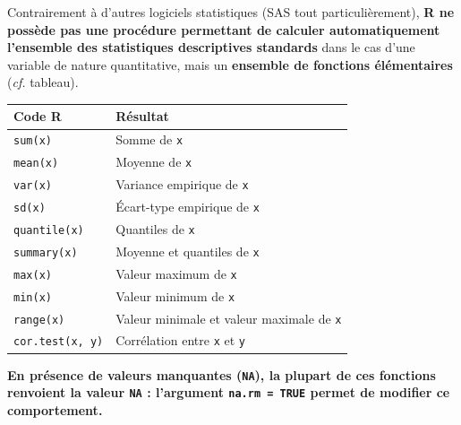 \documentclass[12pt,twosided, notitlepage]{book}
\begin{document}
Contrairement à d'autres logiciels statistiques (SAS tout
particulièrement), \textbf{R ne possède pas une procédure permettant de
calculer automatiquement l'ensemble des statistiques descriptives
standards} dans le cas d'une variable de nature quantitative, mais un
\textbf{ensemble de fonctions élémentaires} (\emph{cf.} tableau).

\begin{longtable}[]{@{}ll@{}}
\toprule
\textbf{Code R} & \textbf{Résultat}\tabularnewline
\midrule
\endhead
\texttt{sum(x)}\index{\texttt{sum}|textbf} & Somme de
\texttt{x}\tabularnewline
\texttt{mean(x)}\index{\texttt{mean}|textbf} & Moyenne de
\texttt{x}\tabularnewline
\texttt{var(x)}\index{\texttt{var}|textbf} & Variance empirique de
\texttt{x}\tabularnewline
\texttt{sd(x)}\index{\texttt{sd}|textbf} & Écart-type empirique de
\texttt{x}\tabularnewline
\texttt{quantile(x)}\index{\texttt{quantile}|textbf} & Quantiles de
\texttt{x}\tabularnewline
\texttt{summary(x)}\index{\texttt{summary}|textbf} & Moyenne et
quantiles de \texttt{x}\tabularnewline
\texttt{max(x)}\index{\texttt{max}|textbf} & Valeur maximum de
\texttt{x}\tabularnewline
\texttt{min(x)}\index{\texttt{min}|textbf} & Valeur minimum de
\texttt{x}\tabularnewline
\texttt{range(x)}\index{\texttt{range}|textbf} & Valeur minimale et
valeur maximale de \texttt{x}\tabularnewline
\texttt{cor.test(x,\ y)}\index{\texttt{cor.test}|textbf} & Corrélation
entre \texttt{x} et \texttt{y}\tabularnewline
\bottomrule
\end{longtable}

\textbf{En présence de valeurs manquantes (\texttt{NA}), la plupart de
ces fonctions renvoient la valeur \texttt{NA} : l'argument
\texttt{na.rm\ =\ TRUE} permet de modifier ce comportement.}
\end{document}
